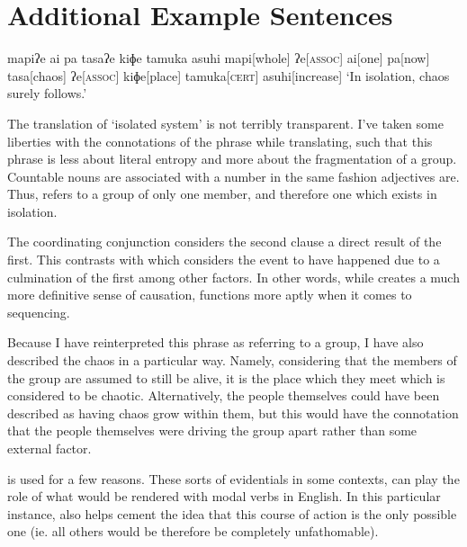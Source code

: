 \chapter{Additional Example Sentences}
\ex
\begingl
\glpreamble mapiʔe ai pa tasaʔe kiɸe tamuka asuhi
\endpreamble
\nogloss{\lbrack}
mapi[whole]
ʔe[\textsc{assoc}]
ai[one]
\nogloss{\rbrack}
pa[now]
tasa[chaos]
ʔe[\textsc{assoc}]
kiɸe[place]
tamuka[\textsc{cert}]
asuhi[increase]
\glft `In isolation, chaos surely follows.'\footnotemark\\
\endgl
\xe


The translation of `isolated system' is not terribly transparent.
I've taken some liberties with the connotations of the phrase while translating, such that this phrase is less about literal entropy and more about the fragmentation of a group.
Countable nouns are associated with a number in the same fashion adjectives are.
Thus,  refers to a group of only one member, and therefore one which exists in isolation.

The coordinating conjunction  considers the second clause a direct result of the first.
This contrasts with  which considers the event to have happened due to a culmination of the first among other factors.
In other words, while  creates a much more definitive sense of causation,  functions more aptly when it comes to sequencing.

Because I have reinterpreted this phrase as referring to a group, I have also described the chaos in a particular way.
Namely, considering that the members of the group are assumed to still be alive, it is the place which they meet which is considered to be chaotic.
Alternatively, the people themselves could have been described as having chaos grow within them, but this would have the connotation that the people themselves were driving the group apart rather than some external factor.

 is used for a few reasons.
These sorts of evidentials in some contexts, can play the role of what would be rendered with modal verbs in English.
In this particular instance,  also helps cement the idea that this course of action is the only possible one (ie. all others would be therefore be completely unfathomable).